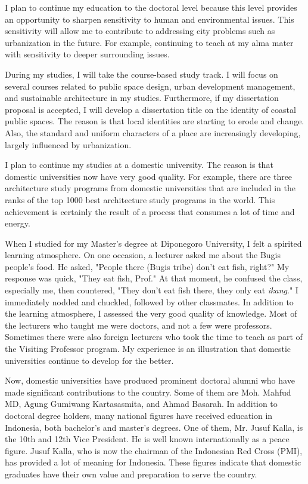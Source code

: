 \documentclass[../main.tex]{subfiles}
\begin{document}
I plan to continue my education to the doctoral level because this level provides an opportunity to sharpen sensitivity to human and environmental issues. This sensitivity will allow me to contribute to addressing city problems such as urbanization in the future. For example, continuing to teach at my alma mater with sensitivity to deeper surrounding issues.

During my studies, I will take the course-based study track. I will focus on several courses related to public space design, urban development management, and sustainable architecture in my studies. Furthermore, if my dissertation proposal is accepted, I will develop a dissertation title on the identity of coastal public spaces. The reason is that local identities are starting to erode and change. Also, the standard and uniform characters of a place are increasingly developing, largely influenced by urbanization.

I plan to continue my studies at a domestic university. The reason is that domestic universities now have very good quality. For example, there are three architecture study programs from domestic universities that are included in the ranks of the top 1000 best architecture study programs in the world. This achievement is certainly the result of a process that consumes a lot of time and energy.

When I studied for my Master's degree at Diponegoro University, I felt a spirited learning atmosphere. On one occasion, a lecturer asked me about the Bugis people's food. He asked, "People there (Bugis tribe) don't eat fish, right?" My response was quick, "They eat fish, Prof." At that moment, he confused the class, especially me, then countered, "They don't eat fish there, they only eat \textit{ikang}." I immediately nodded and chuckled, followed by other classmates. In addition to the learning atmosphere, I assessed the very good quality of knowledge. Most of the lecturers who taught me were doctors, and not a few were professors. Sometimes there were also foreign lecturers who took the time to teach as part of the Visiting Professor program. My experience is an illustration that domestic universities continue to develop for the better.

Now, domestic universities have produced prominent doctoral alumni who have made significant contributions to the country. Some of them are Moh. Mahfud MD, Agung Gumiwang Kartasasmita, and Ahmad Basarah. In addition to doctoral degree holders, many national figures have received education in Indonesia, both bachelor's and master's degrees. One of them, Mr. Jusuf Kalla, is the 10th and 12th Vice President. He is well known internationally as a peace figure. Jusuf Kalla, who is now the chairman of the Indonesian Red Cross (PMI), has provided a lot of meaning for Indonesia. These figures indicate that domestic graduates have their own value and preparation to serve the country.
\end{document}
